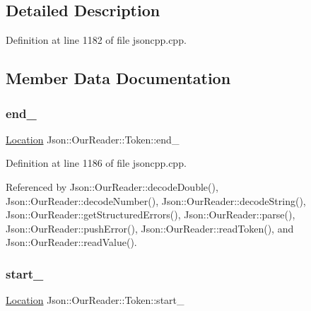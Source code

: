 \subsection{Detailed Description}


Definition at line 1182 of file jsoncpp.\+cpp.



\subsection{Member Data Documentation}
\mbox{\label{class_json_1_1_our_reader_1_1_token_a67d2071638add857528579ae3791eccc}} 
\subsubsection{\texorpdfstring{end\+\_\+}{end\_}}
{\footnotesize\ttfamily \hyperlink{class_json_1_1_our_reader_a1bdc7bbc52ba87cae6b19746f2ee0189}{Location} Json\+::\+Our\+Reader\+::\+Token\+::end\+\_\+}



Definition at line 1186 of file jsoncpp.\+cpp.



Referenced by Json\+::\+Our\+Reader\+::decode\+Double(), Json\+::\+Our\+Reader\+::decode\+Number(), Json\+::\+Our\+Reader\+::decode\+String(), Json\+::\+Our\+Reader\+::get\+Structured\+Errors(), Json\+::\+Our\+Reader\+::parse(), Json\+::\+Our\+Reader\+::push\+Error(), Json\+::\+Our\+Reader\+::read\+Token(), and Json\+::\+Our\+Reader\+::read\+Value().

\mbox{\label{class_json_1_1_our_reader_1_1_token_aedf68bb00eaaa9d3c22b9825999602ac}} 
\subsubsection{\texorpdfstring{start\+\_\+}{start\_}}
{\footnotesize\ttfamily \hyperlink{class_json_1_1_our_reader_a1bdc7bbc52ba87cae6b19746f2ee0189}{Location} Json\+::\+Our\+Reader\+::\+Token\+::start\+\_\+}



